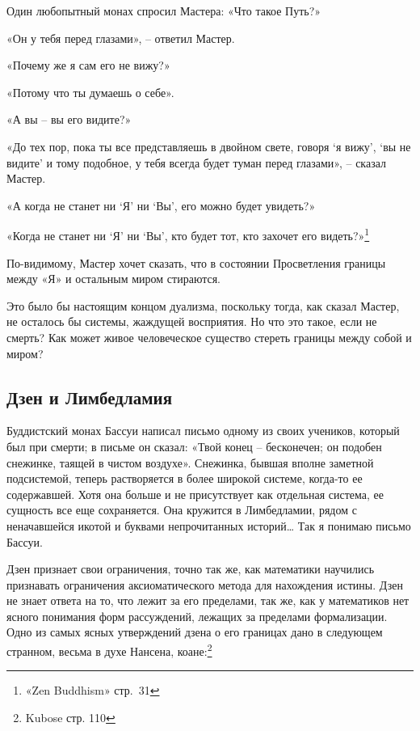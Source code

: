 \documentclass[../main.tex]{subfiles}
\begin{document}
\begin{koan}
    Один любопытный монах спросил Мастера: «Что такое Путь?»

    «Он у тебя перед глазами», \--- ответил Мастер.

    «Почему же я сам его не вижу?»

    «Потому что ты думаешь о себе».

    «А вы \--- вы его видите?»

    «До тех пор, пока ты все представляешь в двойном свете, говоря \enquote*{я вижу}, \enquote*{вы не видите} и тому подобное, у тебя всегда будет туман перед глазами», \--- сказал Мастер.

    «А когда не станет ни \enquote*{Я} ни \enquote*{Вы}, его можно будет увидеть?»

    «Когда не станет ни \enquote*{Я} ни \enquote*{Вы}, кто будет тот, кто захочет его видеть?»\footnote{«Zen Buddhism» стр.~31}
\end{koan}

По-видимому, Мастер хочет сказать, что в состоянии Просветления границы между «Я» и остальным миром стираются.

Это было бы настоящим концом дуализма, поскольку тогда, как сказал Мастер, не осталось бы системы, жаждущей восприятия. Но что это такое, если не смерть? Как может живое человеческое существо стереть границы между собой и миром?


\subsection{Дзен и Лимбедламия}

Буддистский монах Бассуи написал письмо одному из своих учеников, который был при смерти; в письме он сказал: «Твой конец \--- бесконечен; он подобен снежинке, таящей в чистом воздухе». Снежинка, бывшая вполне заметной подсистемой, теперь растворяется в более широкой системе, когда-то ее содержавшей. Хотя она больше и не присутствует как отдельная система, ее сущность все еще сохраняется. Она кружится в Лимбедламии, рядом с неначавшейся икотой и буквами непрочитанных историй\ldots{} Так я понимаю письмо Бассуи.

Дзен признает свои ограничения, точно так же, как математики научились признавать ограничения аксиоматического метода для нахождения истины. Дзен не знает ответа на то, что лежит за его пределами, так же, как у математиков нет ясного понимания форм рассуждений, лежащих за пределами формализации. Одно из самых ясных утверждений дзена о его границах дано в следующем странном, весьма в духе Нансена, коане:\footnote{Kubose стр. 110}
\end{document}
